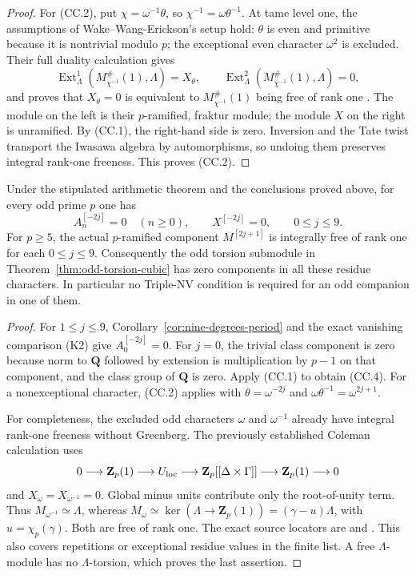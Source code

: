 \begin{proof}
For (CC.2), put $\chi=\omega^{-1}\theta$, so
$\chi^{-1}=\omega\theta^{-1}$. At tame level one, the assumptions
of Wake--Wang-Erickson's setup hold: $\theta$ is even and primitive
because it is nontrivial modulo $p$; the exceptional even character
$\omega^2$ is excluded. Their full duality calculation gives
\[
 \operatorname{Ext}^1_\Lambda(M_{\chi^{-1}}^{\#}(1),\Lambda)
       =X_\theta,
 \qquad
 \operatorname{Ext}^2_\Lambda(M_{\chi^{-1}}^{\#}(1),\Lambda)=0,
\]
and proves that $X_\theta=0$ is equivalent to
$M_{\chi^{-1}}^{\#}(1)$ being free of rank one
\cite[\S2.1, pp.~2--3; Proposition~2.2.6 and its full proof,
p.~4]{WakeWangErickson2017}. The module on the left is their
$p$-ramified, fraktur module; the module $X$ on the right is
unramified. By (CC.1), the right-hand side is zero.
Inversion and the Tate twist transport the Iwasawa algebra by
automorphisms, so undoing them preserves integral rank-one
freeness. This proves (CC.2).
\end{proof}

\begin{corollary}
\label{cor:odd-companion-exclusion}
Under the stipulated arithmetic theorem and the conclusions proved
above, for every odd prime $p$ one has
\[
 A_n^{[-2j]}=0\quad(n\geq0),\qquad X^{[-2j]}=0,
                  \qquad 0\leq j\leq9.
 \tag{CC.4}
\]
For $p\geq5$, the actual $p$-ramified component $M^{[2j+1]}$ is
integrally free of rank one for each $0\leq j\leq9$.
Consequently the odd torsion submodule in
Theorem~\ref{thm:odd-torsion-cubic} has zero components in all
these residue characters. In particular no Triple-NV condition
is required for an odd companion in one of them.
\end{corollary}

\begin{proof}
For $1\leq j\leq9$, Corollary~\ref{cor:nine-degrees-period}
and the exact vanishing comparison (K2) give $A_0^{[-2j]}=0$.
For $j=0$, the trivial class component is zero because norm to
$\mathbf Q$ followed by extension is multiplication by $p-1$
on that component, and the class group of $\mathbf Q$ is zero.
Apply (CC.1) to obtain (CC.4). For a nonexceptional character,
(CC.2) applies with
$\theta=\omega^{-2j}$ and
$\omega\theta^{-1}=\omega^{2j+1}$.

For completeness, the excluded odd characters $\omega$ and
$\omega^{-1}$ already have integral rank-one freeness without
Greenberg. The previously established Coleman calculation uses
\[
0\longrightarrow\mathbf Z_p(1)\longrightarrow U_{\rm loc}
 \longrightarrow\mathbf Z_p[[\Delta\times\Gamma]]
 \longrightarrow\mathbf Z_p(1)\longrightarrow0
\]
and $X_\omega=X_{\omega^{-1}}=0$. Global minus units contribute
only the root-of-unity term. Thus $M_{\omega^{-1}}\simeq\Lambda$,
whereas
$M_\omega\simeq\ker(\Lambda\to\mathbf Z_p(1))
=(\gamma-u)\Lambda$, with $u=\chi_p(\gamma)$.
Both are free of rank one. The exact source locators are
\cite[Theorem~5.5.31, p.~148; Proposition~6.1.1,
pp.~151--152]{SharifiIwasawaNotes} and
\cite[proof of Lemma~5.2.7, p.~13]{WakeWangErickson2017}.
This also covers repetitions or exceptional residue values in
the finite list. A free $\Lambda$-module has no $\Lambda$-torsion,
which proves the last assertion.
\end{proof}

